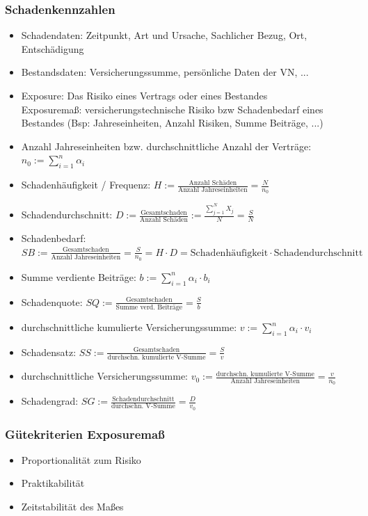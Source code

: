 \documentclass[12pt]{report}
\theoremstyle{dotless}
\theoremstyle{definition}
\begin{document}
\subsubsection{Schadenkennzahlen}
\begin{itemize}
\item Schadendaten: Zeitpunkt, Art und Ursache, Sachlicher Bezug, Ort, Entschädigung
\item Bestandsdaten: Versicherungssumme, persönliche Daten der VN, ...
\item Exposure: Das Risiko eines Vertrags oder eines Bestandes\\
Exposuremaß: versicherungstechnische Risiko bzw Schadenbedarf eines Bestandes (Bsp: Jahreseinheiten, Anzahl Risiken, Summe Beiträge, ...)
\item Anzahl Jahreseinheiten bzw. durchschnittliche Anzahl der Verträge: $n_0 := \sum_{i=1}^{n} \alpha_i$
\item Schadenhäufigkeit / Frequenz: $H:= \frac{\text{Anzahl Schäden}}{\text{Anzahl Jahreseinheiten}} = \frac{N}{n_0}$
\item Schadendurchschnitt: $D:= \frac{\text{Gesamtschaden}}{\text{Anzahl Schäden}} := \frac{\sum_{j=1}^N X_j}{N} = \frac{S}{N}$
\item Schadenbedarf: $SB:= \frac{\text{Gesamtschaden}}{\text{Anzahl Jahreseinheiten}} = \frac{S}{n_0} = H\cdot D = \text{Schadenhäufigkeit} \cdot \text{Schadendurchschnitt}$
\item Summe verdiente Beiträge: $b:= \sum_{i=1}^n \alpha_i \cdot b_i$
\item Schadenquote: $SQ:=\frac{\text{Gesamtschaden}}{\text{Summe verd. Beiträge}} = \frac{S}{b}$
\item durchschnittliche kumulierte Versicherungssumme: $v:= \sum_{i=1}^n \alpha_i \cdot v_i$
\item Schadensatz: $SS:=\frac{\text{Gesamtschaden}}{\text{durchschn. kumulierte V-Summe}} = \frac{S}{v}$
\item durchschnittliche Versicherungssumme: $v_0:= \frac{\text{durchschn. kumulierte V-Summe}}{\text{Anzahl Jahreseinheiten}} = \frac{v}{n_0}$
\item Schadengrad: $SG:=\frac{\text{Schadendurchschnitt}}{\text{durchschn. V-Summe}} = \frac{D}{v_0}$
\end{itemize}

\subsubsection{Gütekriterien Exposuremaß}
\begin{itemize}
\item Proportionalität zum Risiko
\item Praktikabilität
\item Zeitstabilität des Maßes
\end{itemize}
\end{document}
